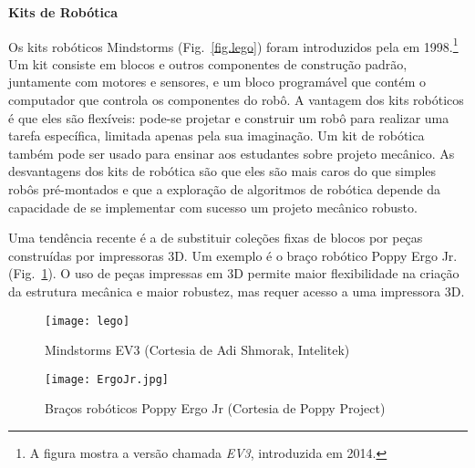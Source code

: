 %
%
%
\smallskip

\noindent\textbf{Kits de Robótica}

Os kits robóticos Mindstorms (Fig.~\ref{fig.lego}) foram introduzidos pela \lego{} em 1998.\footnote{A figura mostra a versão chamada \emph{EV3}, introduzida em 2014.} Um kit consiste em blocos e outros componentes de construção padrão, juntamente com motores e sensores, e um bloco programável que contém o computador que controla os componentes do robô. A vantagem dos kits robóticos é que eles são flexíveis: pode-se projetar e construir um robô para realizar uma tarefa específica, limitada apenas pela sua imaginação. Um kit de robótica também pode ser usado para ensinar aos estudantes sobre projeto mecânico. As desvantagens dos kits de robótica são que eles são mais caros do que simples robôs pré-montados e que a exploração de algoritmos de robótica depende da capacidade de se implementar com sucesso um projeto mecânico robusto.

Uma tendência recente é a de substituir coleções fixas de blocos por peças construídas por impressoras 3D. Um exemplo é o braço robótico Poppy Ergo Jr. (Fig.~\ref{fig.poppy}). O uso de peças impressas em 3D permite maior flexibilidade na criação da estrutura mecânica e maior robustez, mas requer acesso a uma impressora 3D. 

\begin{figure}
\begin{minipage}{.45\textwidth}
\begin{center}
\texttt{[image: lego]}
\end{center}
\caption{\lego{} Mindstorms EV3 (Cortesia de Adi Shmorak, Intelitek)}
\label{fig.lego}
\end{minipage}
\hspace{\fill}
\begin{minipage}{.45\textwidth}
\begin{center}
\texttt{[image: ErgoJr.jpg]}
\end{center}
\caption{Braços robóticos Poppy Ergo Jr (Cortesia de Poppy Project)}
\label{fig.poppy}
\end{minipage}
\end{figure}


